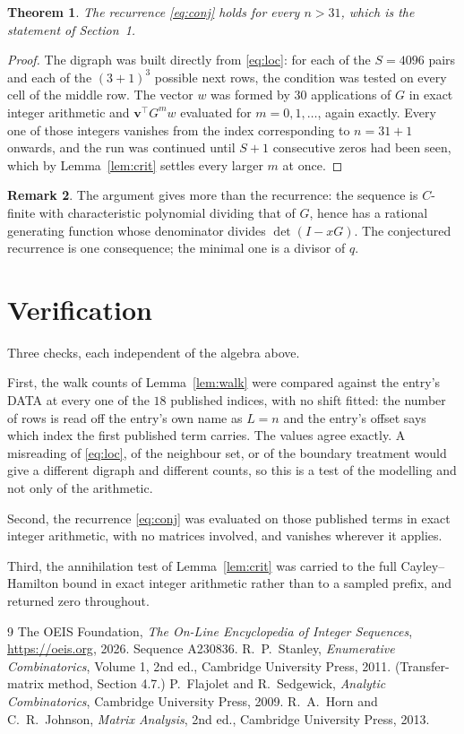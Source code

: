 \documentclass[11pt,a4paper]{article}
\theoremstyle{plain}
\newtheorem{theorem}{Theorem}
\theoremstyle{definition}
\newtheorem{remark}[theorem]{Remark}
\begin{document}
\begin{theorem}
The recurrence \eqref{eq:conj} holds for every $n>31$, which is the statement of
Section~1.
\end{theorem}

\begin{proof}
The digraph was built directly from \eqref{eq:loc}: for each of the $S=4096$ pairs and each
of the $(3+1)^{3}$ possible next rows, the condition was tested on every cell of
the middle row. The vector $w$ was formed by $30$ applications of $G$ in exact integer
arithmetic and $\mathbf{v}^{\!\top}G^{m}w$ evaluated for $m=0,1,\dots$, again exactly.
Every one of those integers vanishes from the index corresponding to $n=31+1$ onwards,
and the run was continued until $S+1$ consecutive zeros had been seen, which by
Lemma~\ref{lem:crit} settles every larger $m$ at once.
\end{proof}

\begin{remark}
The argument gives more than the recurrence: the sequence is $C$-finite with characteristic
polynomial dividing that of $G$, hence has a rational generating function whose denominator
divides $\det(I-xG)$. The conjectured recurrence is one consequence; the minimal one is a
divisor of $q$.
\end{remark}

\section{Verification}

Three checks, each independent of the algebra above.

First, the walk counts of Lemma~\ref{lem:walk} were compared against the entry's DATA at
every one of the $18$ published indices, with no shift fitted: the number of rows is
read off the entry's own name as $L=n$ and the entry's offset says which index the first
published term carries. The values agree exactly. A misreading of \eqref{eq:loc}, of the
neighbour set, or of the boundary treatment would give a different digraph and different
counts, so this is a test of the modelling and not only of the arithmetic.

Second, the recurrence \eqref{eq:conj} was evaluated on those published terms in exact
integer arithmetic, with no matrices involved, and vanishes wherever it applies.

Third, the annihilation test of Lemma~\ref{lem:crit} was carried to the full
Cayley--Hamilton bound in exact integer arithmetic rather than to a sampled prefix, and
returned zero throughout.

\begin{thebibliography}{9}
 The OEIS Foundation, \emph{The On-Line Encyclopedia of Integer
Sequences}, \url{https://oeis.org}, 2026. Sequence A230836.
 R.~P.~Stanley, \emph{Enumerative Combinatorics}, Volume 1, 2nd ed.,
Cambridge University Press, 2011. (Transfer-matrix method, Section 4.7.)
 P.~Flajolet and R.~Sedgewick, \emph{Analytic Combinatorics}, Cambridge
University Press, 2009.
 R.~A.~Horn and C.~R.~Johnson, \emph{Matrix Analysis}, 2nd ed., Cambridge
University Press, 2013.
\end{thebibliography}
\end{document}
